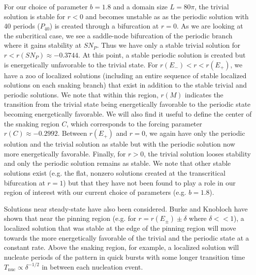 \documentclass[../main/TimeForcingSHE.tex]{subfiles}
\begin{document}
For our choice of parameter $b=1.8$ and a domain size $L=80\pi$, the trivial solution is stable for $r<0$ and becomes unstable as as the periodic solution with 40 periods ($P_{40}$) is created through a bifurcation at $r=0$.  As we are looking at the subcritical case, we see a saddle-node bifurcation of the periodic branch where it gains stability at $SN_P$.  Thus we have only a stable trivial solution for $r<r(SN_P)\approx -0.3744$. At this point, a stable periodic solution is created but is energetically unfavorable to the trivial state.  For $r(E_-)<r<r(E_+)$, we have a zoo of localized solutions (including an entire sequence of stable localized solutions on each snaking branch) that exist in addition to the stable trivial and periodic solutions.  We note that within this region, $r(M)$ indicates the transition from the trivial state being energetically favorable to the periodic state becoming energetically favorable.  We will also find it useful to define the center of the snaking region $C$, which corresponds to  the forcing parameter $r(C)\approx -0.2992$.  Between $r(E_+)$ and $r=0$, we again have only the periodic solution and the trivial solution as stable  but with the periodic solution now more energetically favorable.   Finally, for $r>0$, the trivial solution looses stability and only the periodic solution remains as stable.  We note that other stable solutions exist (e.g. the flat, nonzero solutions created at the transcritical bifurcation at $r=1$) but that they have not been found to play a role in our region of interest with our current choice of parameters (e.g. $b=1.8$). 

Solutions near steady-state have also been considered.  Burke and Knobloch \cite{burke2006} have shown that near the pinning region (e.g. for $r=r(E_{\pm})\pm\delta$ where $\delta <<1$), a localized solution that was stable at the edge of the pinning region will move towards the more energetically favorable of the trivial and the periodic state at a constant rate.  Above the snaking region, for example, a localized solution will nucleate periods of the pattern in quick bursts with some longer transition time $T_{\text{nuc}}\propto \delta^{-1/2}$ in between each nucleation event.  
\end{document}
